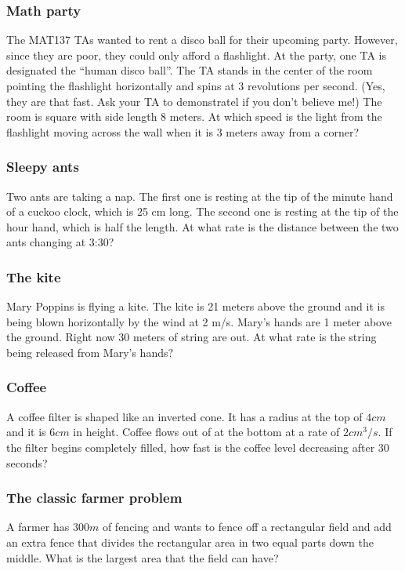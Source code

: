 \documentclass[14pt]{beamer}
\begin{document}
\begin{frame}[t]
	\frametitle{Math party}

	The MAT137 TAs wanted to rent a disco ball for their upcoming party. However,
	since they are poor, they could only afford a flashlight. At the party, one TA
	is designated the ``human disco ball''. The TA stands in the center of the
	room pointing the flashlight horizontally and spins at 3 revolutions per
	second. (Yes, they are that fast. Ask your TA to demonstratel if you don't
	believe me!) The room is square with side length 8 meters. At which speed is the
	light from the flashlight moving across the wall when it is 3 meters away from
	a corner?
\end{frame}

\begin{frame}[t]
	\frametitle{Sleepy ants}

	Two ants are taking a nap. The first one is resting at the tip of the minute hand
	of a cuckoo clock, which is 25 cm long. The second one is resting at the tip of
	the hour hand, which is half the length. At what rate is the distance between the
	two ants changing at 3:30?
\end{frame}

\begin{frame}[t]
	\frametitle{The kite}

	Mary Poppins is flying a kite. The kite is 21 meters above the ground and it is
	being blown horizontally by the wind at 2 m/s. Mary's hands are 1 meter above
	the ground. Right now 30 meters of string are out. At what rate is the string
	being released from Mary's hands?
\end{frame}

\begin{frame}[t]
	\frametitle{Coffee}

	A coffee filter is shaped like an inverted cone. It has a radius at the top of
	$4cm$ and it is $6cm$ in height. Coffee flows out of at the bottom at a rate
	of $2cm^{3}/s$. If the filter begins completely filled, how fast is the coffee
	level decreasing after 30 seconds?
\end{frame}

\begin{frame}[t]
	\frametitle{The classic farmer problem}

	A farmer has $300m$ of fencing and wants to fence off a rectangular field and
	add an extra fence that divides the rectangular area in two equal parts down
	the middle. What is the largest area that the field can have?
\end{frame}
\end{document}
